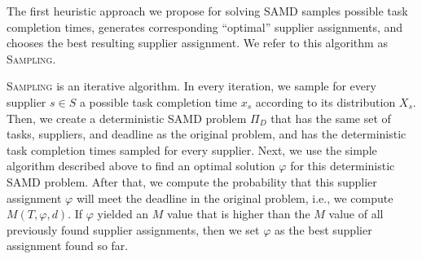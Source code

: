\documentclass[letterpaper]{article} %
\newcommand{\samd}{\ac{SAMD}\xspace}
\newcommand{\sampling}{\textsc{Sampling}\xspace}
\begin{document}
The first heuristic approach we propose for solving \samd samples possible task completion times, generates corresponding ``optimal'' supplier assignments, and chooses the best resulting supplier assignment. We refer to this algorithm as \sampling. 


\sampling is an iterative algorithm. 
In every iteration, we sample for every supplier $s\in S$ a possible task completion time $x_s$ according to its distribution $X_s$. 
Then, we create a deterministic \samd problem $\Pi_D$ that has the same set of tasks, suppliers, and deadline as the original problem, and has the deterministic task completion times sampled for every supplier. Next, we use the simple algorithm described above to find an optimal solution $\varphi$ for this deterministic \samd problem. After that, we compute the probability that this supplier assignment $\varphi$ will meet the deadline in the original problem, i.e., we compute $M(T,\varphi,d)$. If $\varphi$ yielded an $M$ value that is higher than the $M$ value of all previously found supplier assignments, then we set $\varphi$ as the best supplier assignment found so far. 



\end{document}
